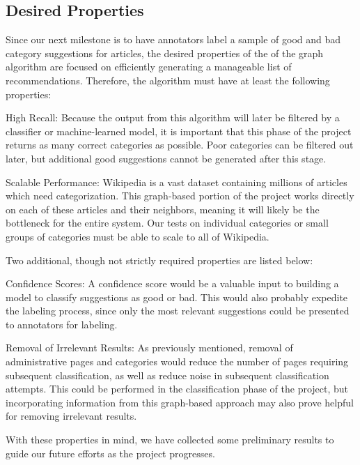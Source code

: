 \documentclass[]{sig-alternate}
\begin{document}
\subsection{Desired Properties}
\label{subsec:desired_properties}
Since our next milestone is to have annotators label a sample of good and bad category suggestions for articles, the desired properties of the of the graph algorithm are focused on efficiently generating a manageable list of recommendations. Therefore, the algorithm must have at least the following properties:
\begin{itemize*}
	\item {\sc High Recall}: Because the output from this algorithm will later be filtered by a classifier or machine-learned model, it is important that this phase of the project returns as many correct categories as possible. Poor categories can be filtered out later, but additional good suggestions cannot be generated after this stage.
	\item {\sc Scalable Performance}: Wikipedia is a vast dataset containing millions of articles which need categorization. This graph-based portion of the project works directly on each of these articles and their neighbors, meaning it will likely be the bottleneck for the entire system. Our tests on individual categories or small groups of categories must be able to scale to all of Wikipedia.
\end{itemize*}
Two additional, though not strictly required properties are listed below:
\begin{itemize*}
	\item {\sc Confidence Scores}: A confidence score would be a valuable input to building a model to classify suggestions as good or bad. This would also probably expedite the labeling process, since only the most relevant suggestions could be presented to annotators for labeling.
	\item {\sc Removal of Irrelevant Results}: As previously mentioned, removal of administrative pages and categories would reduce the number of pages requiring subsequent classification, as well as reduce noise in subsequent classification attempts. This could be performed in the classification phase of the project, but incorporating information from this graph-based approach may also prove helpful for removing irrelevant results.
\end{itemize*}
With these properties in mind, we have collected some preliminary results to guide our future efforts as the project progresses.
\end{document}
